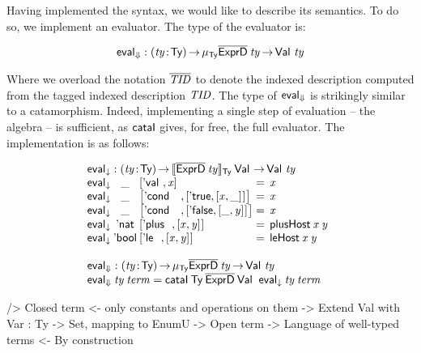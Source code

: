 Having implemented the syntax, we would like to describe its
semantics. To do so, we implement an evaluator. The type of the
evaluator is:

\[
\evalH : \PI{\V{ty}}{\Ty} 
         \IMu{\Ty}{\toIDesc{\HExprD}}{\V{ty}} \To
         \Val{\V{ty}}
\]


Where we overload the notation $\toIDesc{\V{TID}}$ to denote the
indexed description computed from the tagged indexed description
$\V{TID}$. The type of $\evalH$ is strikingly similar to a
catamorphism. Indeed, implementing a single step of evaluation -- the
algebra -- is sufficient, as $\F{cataI}$ gives, for free, the full
evaluator. The implementation is as follows:


\[\stk{
\evalOne : \PI{\V{ty}}{\Ty} \idescop{\toIDesc{\HExprD}\:\V{ty}}{\Ty}{\Val{\!}}
           \To {\Val{\V{ty}}} \\
\begin{array}{@{}l@{}c@{}l@{\:=\:\:}l}
\evalOne\: & \_\: & \pair{\Eval{}}{\V{x}}{}                                         & \V{x} \\
\evalOne\: & \_\: & \pair{\Econd{}{}{}}{\pair{\BoolTrue}{\pair{\V{x}}{\_}{}}{}}{}   & \V{x} \\
\evalOne\: & \_\: & \pair{\Econd{}{}{}}{\pair{\BoolFalse}{\pair{\_}{\V{y}}{}}{}}{}  & \V{x} \\
\evalOne\: & \Enat\: & \pair{\Eplus{}{}}{\pair{\V{x}}{\V{y}}{}}{}                       & \F{plusHost}\: \V{x}\: \V{y} \\
\evalOne\: & \Ebool\: & \pair{\Ele{}{}}{\pair{\V{x}}{\V{y}}{}}{}                        & \F{leHost}\: \V{x}\: \V{y} 
\end{array} \\
\\
\evalH : \PI{\V{ty}}{\Ty} 
           \IMu{\Ty}{\toIDesc{\HExprD}}{\V{ty}} \To
           \Val{\V{ty}} \\
\evalH\: \V{ty}\: \V{term} = \F{cataI}\: \Ty\: 
                                 \toIDesc{\HExprD}\: 
                                 \Val{}\: 
                                 \evalOne\: 
                                 \V{ty}\: 
                                 \V{term}
}\]

\begin{wstructure}
    /> Closed term
        <- only constants and operations on them
        -> Extend Val with Var : Ty -> Set, mapping to EnumU
            -> Open term
            -> Language of well-typed terms
                <- By construction
\end{wstructure}

